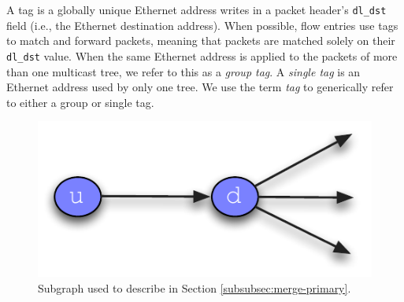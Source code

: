 A tag is a globally unique Ethernet address \merge writes in a packet header's {\tt dl\_dst} field (i.e., the Ethernet destination address).  When possible, \merge flow entries use 
tags to match and forward packets, meaning that packets are matched solely on their {\tt dl\_dst} value.
When the same Ethernet address is applied to the packets of more than one multicast tree, we refer to this as a \emph{group tag}.  A \emph{single tag} is an 
Ethernet address used by only one tree. We use the term \emph{tag} to generically refer to either a group or single tag.

\begin{figure}
  \centering
   \includegraphics[scale=0.5]{figs/merger-ud.pdf}
\caption{Subgraph used to describe \merge in Section \ref{subsubsec:merge-primary}.}
\label{fig:merger-ud}
\end{figure}


